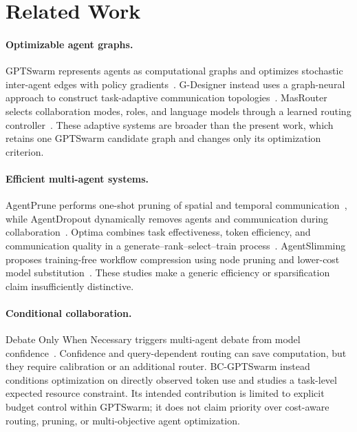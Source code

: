 \section{Related Work}

\paragraph{Optimizable agent graphs.}
GPTSwarm represents agents as computational graphs and optimizes stochastic inter-agent edges with policy gradients~\cite{pmlr-v235-zhuge24a}. G-Designer instead uses a graph-neural approach to construct task-adaptive communication topologies~\cite{zhang2024gdesigner}. MasRouter selects collaboration modes, roles, and language models through a learned routing controller~\cite{yue2025masrouter}. These adaptive systems are broader than the present work, which retains one GPTSwarm candidate graph and changes only its optimization criterion.

\paragraph{Efficient multi-agent systems.}
AgentPrune performs one-shot pruning of spatial and temporal communication~\cite{zhang2024agentprune}, while AgentDropout dynamically removes agents and communication during collaboration~\cite{wang2025agentdropout}. Optima combines task effectiveness, token efficiency, and communication quality in a generate--rank--select--train process~\cite{chen2024optima}. AgentSlimming proposes training-free workflow compression using node pruning and lower-cost model substitution~\cite{chen2026agentslimming}. These studies make a generic efficiency or sparsification claim insufficiently distinctive.

\paragraph{Conditional collaboration.}
Debate Only When Necessary triggers multi-agent debate from model confidence~\cite{eo2025debate}. Confidence and query-dependent routing can save computation, but they require calibration or an additional router. BC-GPTSwarm instead conditions optimization on directly observed token use and studies a task-level expected resource constraint. Its intended contribution is limited to explicit budget control within GPTSwarm; it does not claim priority over cost-aware routing, pruning, or multi-objective agent optimization.
